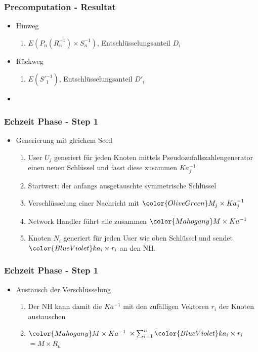 \documentclass[t, xcolor=dvipsnames]{beamer}
\begin{document}
\begin{frame}
	\frametitle{Precomputation - Resultat}
	\begin{itemize}
		
		\item Hinweg
		\begin{enumerate}
			\item $E(P_n(R_n^{-1}) \times S_n^{-1})$, Entschlüsselungsanteil $D_i$
		\end{enumerate}
		\item Rückweg
		\begin{enumerate}
			\item $E({S'}_1^{-1})$, Entschlüsselungsanteil $D'_i$
		\end{enumerate}
		\item 
		
		 
	\end{itemize}
	\vspace{\fill}
\end{frame}


\begin{frame}
	\frametitle{Echzeit Phase - Step 1}
	\begin{itemize}
		\item Generierung mit gleichem Seed
		\begin{enumerate}
		\item User $U_j$ generiert für jeden Knoten mittels Pseudozufallszahlengenerator einen neuen Schlüssel und fasst diese zusammen $Ka_j ^{-1}$
		\item Startwert: der anfangs ausgetauschte symmetrische Schlüssel
		\item Verschlüsselung einer Nachricht mit $\color{OliveGreen} M_j \times Ka_j ^{-1}$
		\item Network Handler führt alle zusammen $\color{Mahogany} M \times Ka^{-1}$
		\item Knoten $N_i$ generiert für jeden User wie oben Schlüssel und sendet $\color{BlueViolet}ka_i \times r_i$ an den NH.
		
		\end{enumerate}
		
		\end{itemize}
	\vspace{\fill}
\end{frame}

\begin{frame}
	\frametitle{Echzeit Phase - Step 1}
	\begin{itemize}
		\item Austausch der Verschlüsselung
		\begin{enumerate}
		
		\item Der NH kann damit die $Ka^{-1}$ mit den zufälligen Vektoren $r_i$ der Knoten austauschen
		\item $ \color{Mahogany} M \times Ka^{-1}$ $\times \sum_{i=1}^n \color{BlueViolet}ka_i \times r_i$ $= M \times R_n$

		\end{enumerate}

		
	\end{itemize}
	\vspace{\fill}
\end{frame}
\end{document}
